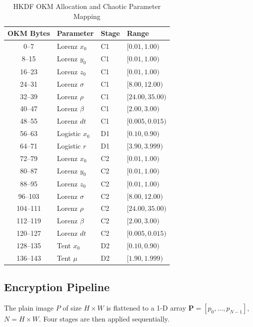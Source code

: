 \documentclass[conference]{IEEEtran}
\begin{document}
\begin{table}[htbp]
	\caption{HKDF OKM Allocation and Chaotic Parameter Mapping}
	\label{tab:hkdf_params}
	\begin{center}
		\begin{tabular}{|c|l|l|l|}
			\hline
			\textbf{OKM Bytes} & \textbf{Parameter} & \textbf{Stage} & \textbf{Range} \\
			\hline
			0--7   & Lorenz $x_0$ & C1 & $[0.01,1.00)$ \\
			8--15  & Lorenz $y_0$ & C1 & $[0.01,1.00)$ \\
			16--23 & Lorenz $z_0$ & C1 & $[0.01,1.00)$ \\
			24--31 & Lorenz $\sigma$ & C1 & $[8.00,12.00)$ \\
			32--39 & Lorenz $\rho$ & C1 & $[24.00,35.00)$ \\
			40--47 & Lorenz $\beta$ & C1 & $[2.00,3.00)$ \\
			48--55 & Lorenz $dt$ & C1 & $[0.005,0.015)$ \\
			56--63 & Logistic $x_0$ & D1 & $[0.10,0.90)$ \\
			64--71 & Logistic $r$ & D1 & $[3.90,3.999)$ \\
			72--79 & Lorenz $x_0$ & C2 & $[0.01,1.00)$ \\
			80--87 & Lorenz $y_0$ & C2 & $[0.01,1.00)$ \\
			88--95 & Lorenz $z_0$ & C2 & $[0.01,1.00)$ \\
			96--103 & Lorenz $\sigma$ & C2 & $[8.00,12.00)$ \\
			104--111 & Lorenz $\rho$ & C2 & $[24.00,35.00)$ \\
			112--119 & Lorenz $\beta$ & C2 & $[2.00,3.00)$ \\
			120--127 & Lorenz $dt$ & C2 & $[0.005,0.015)$ \\
			128--135 & Tent $x_0$ & D2 & $[0.10,0.90)$ \\
			136--143 & Tent $\mu$ & D2 & $[1.90,1.999)$ \\
			\hline
		\end{tabular}
	\end{center}
\end{table}

\subsection{Encryption Pipeline}

The plain image $P$ of size $H\!\times\!W$ is flattened to a 1-D array $\mathbf{P}=[p_0,\ldots,p_{N-1}]$, $N=H\!\times\!W$. Four stages are then applied sequentially.
\end{document}
